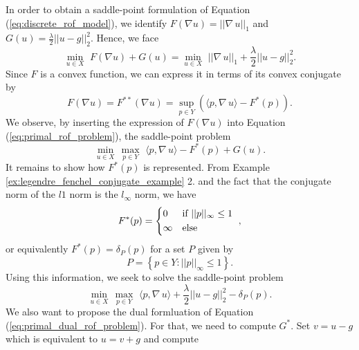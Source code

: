 \documentclass[abstracton]{scrreprt}
\begin{document}
            In order to obtain a saddle-point formulation of Equation (\ref{eq:discrete_rof_model}), we identify $F(\nabla u) = ||\nabla \, u||_{1}$ and $G(u) = \frac{\lambda}{2} ||u - g||_{2}^{2}$. Hence, we face
                \begin{equation}
                    \min_{u \in X}\,\, F(\nabla u) + G(u) = \min_{u \in X}\,\, ||\nabla \, u||_{1} + \frac{\lambda}{2} ||u - g||_{2}^{2}.
                \label{eq:primal_rof_problem}
                \end{equation}
            Since $F$ is a convex function, we can express it in terms of its convex conjugate by
                $$
                    F(\nabla u) = F^{\ast\ast}(\nabla u) = \sup\limits_{p \in Y} \left(\langle p, \nabla \, u \rangle - F^{\ast}(p) \right).
                $$
            We observe, by inserting the expression of $F(\nabla u)$ into Equation (\ref{eq:primal_rof_problem}), the saddle-point problem
                $$
                    \min_{u \in X}\, \max_{p \in Y}\,\, \langle p, \nabla \, u \rangle - F^{\ast}(p) + G(u).
                $$
            It remains to show how $F^{\ast}(p)$ is represented. From Example \ref{ex:legendre_fenchel_conjugate_example} 2. and the fact that the conjugate norm of the $l1$ norm is the $l_{\infty}$ norm, we have
                $$
                    F^{\ast}(p) =
                        \begin{dcases*}
                            0 & \textnormal{if $||p||_{\infty} \le 1$} \\
                            \infty & \textnormal{else}
                        \end{dcases*},
                $$
            or equivalently $F^{\ast}(p) = \delta_{P}(p)$ for a set $P$ given by
                \begin{equation}
                    P = \left\{ p \in Y : ||p||_{\infty} \le 1 \right\}.
                    \label{eq:the_set_P}
                \end{equation}
            Using this information, we seek to solve the saddle-point problem
                \begin{equation}
                    \min_{u \in X}\, \max_{p \in Y}\,\, \langle p, \nabla\, u \rangle + \frac{\lambda}{2} ||u - g||_{2}^{2} - \delta_{P}(p).
                \label{eq:primal_dual_rof_problem}
                \end{equation}
            We also want to propose the dual formluation of Equation (\ref{eq:primal_dual_rof_problem}). For that, we need to compute $G^{\ast}$. Set $v = u - g$ which is equivalent to $u = v + g$ and compute
\end{document}
